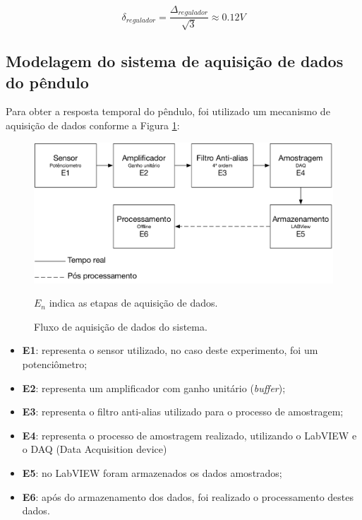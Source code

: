 \documentclass[a4paper]{instrumentacao}
\begin{document}
\begin{equation}
	\delta_{regulador} = \frac{\Delta_{regulador}}{\sqrt{3}} \approx 0.12 V
	\label{eq:incerteza-regulador}
\end{equation}

\subsection{Modelagem do sistema de aquisição de dados do pêndulo}

Para obter a resposta temporal do pêndulo, foi utilizado um mecanismo de aquisição de dados conforme a Figura \ref{fig:pendulo-fluxo-medidas}:

\begin{figure}[H]
\centering
\includegraphics[width=\textwidth]{Pendulo-Fluxograma.pdf}
\caption{Fluxo de aquisição de dados do sistema.}
$E_n$ indica as etapas de aquisição de dados.
\label{fig:pendulo-fluxo-medidas}
\end{figure}

\begin{itemize}
	\item \textbf{E1}: representa o sensor utilizado, no caso deste experimento, foi um potenciômetro;
	\item \textbf{E2}: representa um amplificador com ganho unitário (\textit{buffer});
	\item \textbf{E3}: representa o filtro anti-alias utilizado para o processo de amostragem;
	\item \textbf{E4}: representa o processo de amostragem realizado, utilizando o LabVIEW e o DAQ (Data Acquisition device)
	\item \textbf{E5}: no LabVIEW foram armazenados os dados amostrados;
	\item \textbf{E6}: após do armazenamento dos dados, foi realizado o processamento destes dados.
\end{itemize}
\end{document}
